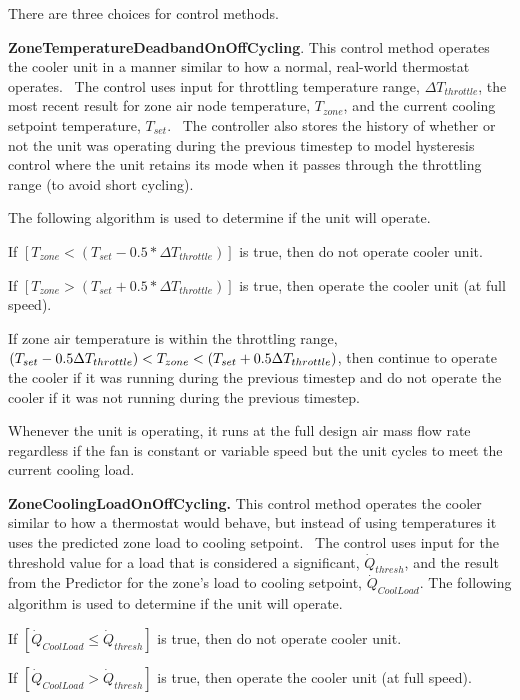 There are three choices for control methods.

\textbf{ZoneTemperatureDeadbandOnOffCycling}. This control method operates the cooler unit in a manner similar to how a normal, real-world thermostat operates.~ The control uses input for throttling temperature range, \(\Delta {T_{throttle}}\), the most recent result for zone air node temperature, \({T_{zone}}\), and the current cooling setpoint temperature, \({T_{set}}\).~ The controller also stores the history of whether or not the unit was operating during the previous timestep to model hysteresis control where the unit retains its mode when it passes through the throttling range (to avoid short cycling).

The following algorithm is used to determine if the unit will operate.

If \(\left[ {{T_{zone}} < \left( {{T_{set}} - 0.5*\Delta {T_{throttle}}} \right)} \right]\) is true, then do not operate cooler unit.

If \(\left[ {{T_{zone}} > \left( {{T_{set}} + 0.5*\Delta {T_{throttle}}} \right)} \right]\) is true, then operate the cooler unit (at full speed).

If zone air temperature is within the throttling range, $\left(T_{set}-0.5\Delta T_{throttle}\right) < T_{zone} < \left(T_{set}+0.5\Delta T_{throttle}\right)$, then continue to operate the cooler if it was running during the previous timestep and do not operate the cooler if it was not running during the previous timestep.

Whenever the unit is operating, it runs at the full design air mass flow rate regardless if the fan is constant or variable speed but the unit cycles to meet the current cooling load.

\textbf{ZoneCoolingLoadOnOffCycling.} This control method operates the cooler similar to how a thermostat would behave, but instead of using temperatures it uses the predicted zone load to cooling setpoint.~ The control uses input for the threshold value for a load that is considered a significant, \({\dot Q_{thresh}}\), and the result from the Predictor for the zone's load to cooling setpoint, \({\dot Q_{CoolLoad}}\). The following algorithm is used to determine if the unit will operate.

If \(\left[ {{{\dot Q}_{CoolLoad}} \le {{\dot Q}_{thresh}}} \right]\) is true, then do not operate cooler unit.

If \(\left[ {{{\dot Q}_{CoolLoad}} > {{\dot Q}_{thresh}}} \right]\) is true, then operate the cooler unit (at full speed).

